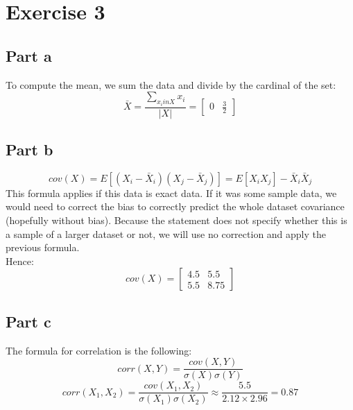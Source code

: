 \documentclass[a4paper, 10pt]{article}
\begin{document}
\section{Exercise 3}
\subsection{Part a}
To compute the mean, we sum the data and divide by the cardinal of the set:
$$
\bar{X} = \frac{\sum_{x_i in X}x_i}{\left\vert X\right\vert} = 
\begin{bmatrix}
    0 & \frac{3}{2}
\end{bmatrix}
$$

\subsection{Part b}
$$
cov(X) = E\left[(X_i - \bar X_i)(X_j - \bar X_j)\right] = E\left[X_iX_j\right] - \bar X_i\bar X_j
$$
This formula applies if this data is exact data. If it was some sample data, we would need to correct the 
bias to correctly predict the whole dataset covariance (hopefully without bias).
Because the statement does not specify whether this is a sample of a larger dataset or not,
we will use no correction and apply the previous formula.
\\
Hence:
$$
cov(X) = \begin{bmatrix}
            4.5 & 5.5\\
            5.5 & 8.75
        \end{bmatrix}
$$

\subsection{Part c}
The formula for correlation is the following:
$$
corr(X, Y) = \frac{cov(X, Y)}{\sigma(X)\sigma(Y)}
$$
$$
corr(X_1, X_2) = \frac{cov(X_1, X_2)}{\sigma(X_1)\sigma(X_2)} \approx \frac{5.5}{2.12\times 2.96} = 0.87
$$
\end{document}
